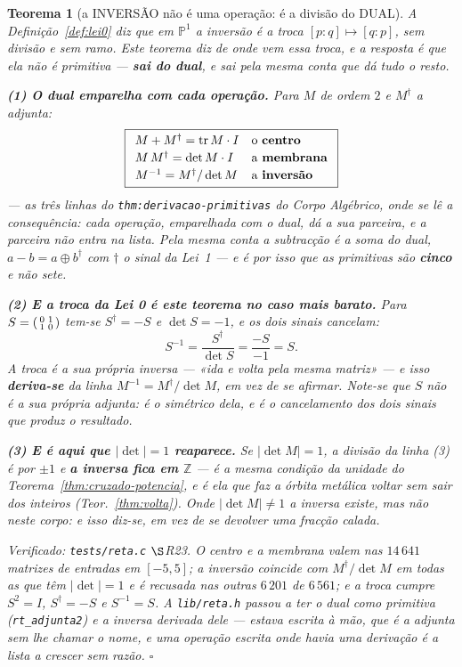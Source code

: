 \documentclass[11pt,a4paper]{article}
\newtheorem{teorema}{Teorema}
\newcommand{\code}[1]{\texttt{\small #1}}
\begin{document}
\begin{teorema}[a INVERSÃO não é uma operação: é a divisão do
DUAL]\label{thm:inversao-dual}
A Definição~\ref{def:lei0} diz que em $\mathbb{P}^1$ a inversão é a
\emph{troca} $[p:q]\mapsto[q:p]$, sem divisão e sem ramo. Este teorema diz de
onde vem essa troca, e a resposta é que ela não é primitiva --- \textbf{sai do
dual}, e sai pela mesma conta que dá tudo o resto.

\textbf{(1) O dual emparelha com cada operação.} Para $M$ de ordem $2$ e
$M^{\dagger}$ a adjunta:
\[
\boxed{
\begin{array}{lll}
M+M^{\dagger}=\operatorname{tr}M\cdot I & \text{o \textbf{centro}}\\[2pt]
M\,M^{\dagger}=\det M\cdot I & \text{a \textbf{membrana}}\\[2pt]
M^{-1}=M^{\dagger}/\det M & \text{a \textbf{inversão}}
\end{array}}
\]
--- as três linhas do \code{thm:derivacao-primitivas} do \emph{Corpo Algébrico},
onde se lê a consequência: \emph{cada operação, emparelhada com o dual, dá a sua
parceira, e a parceira não entra na lista}. Pela mesma conta a subtracção é a
soma do dual, $a-b=a\oplus b^{\dagger}$ com $\dagger$ o \emph{sinal} da Lei~1 --- e
é por isso que as primitivas são \textbf{cinco} e não sete.

\textbf{(2) E a troca da Lei 0 é este teorema no caso mais barato.} Para
$S=\begin{psmallmatrix}0&1\\1&0\end{psmallmatrix}$ tem-se $S^{\dagger}=-S$ e
$\det S=-1$, e os \emph{dois sinais cancelam}:
\[
S^{-1}=\frac{S^{\dagger}}{\det S}=\frac{-S}{-1}=S .
\]
A troca é a sua própria inversa --- «ida e volta pela mesma matriz» --- e isso
\textbf{deriva-se} da linha $M^{-1}=M^{\dagger}/\det M$, em vez de se afirmar.
Note-se que $S$ \emph{não} é a sua própria adjunta: é o simétrico dela, e é o
cancelamento dos dois sinais que produz o resultado.

\textbf{(3) E é aqui que $|\det|=1$ reaparece.} Se $|\det M|=1$, a divisão da
linha (3) é por $\pm1$ e \textbf{a inversa fica em $\mathbb{Z}$} --- é a mesma
condição da unidade do Teorema~\ref{thm:cruzado-potencia}, e é ela que faz a
órbita metálica voltar sem sair dos inteiros (Teor.~\ref{thm:volta}). Onde
$|\det M|\neq1$ a inversa existe, mas não neste corpo: e isso diz-se, em vez de
se devolver uma fracção calada.

\emph{Verificado:} \code{tests/reta.c} $\S$R23. O centro e a membrana valem nas
$14\,641$ matrizes de entradas em $[-5,5]$; a inversão coincide com
$M^{\dagger}/\det M$ em todas as que têm $|\det|=1$ e é \emph{recusada} nas
outras $6\,201$ de $6\,561$; e a troca cumpre $S^2=I$, $S^{\dagger}=-S$ e
$S^{-1}=S$. A \code{lib/reta.h} passou a ter o dual como primitiva
(\code{rt\_adjunta2}) e a inversa \emph{derivada} dele --- estava escrita à mão,
que é a adjunta sem lhe chamar o nome, e uma operação escrita onde havia uma
derivação é a lista a crescer sem razão. $\square$
\end{teorema}
\end{document}
